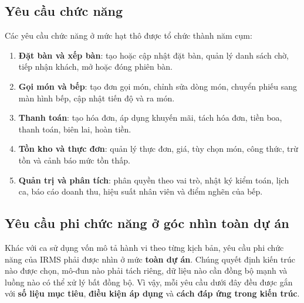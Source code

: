 \documentclass[11pt,a4paper]{article}
\begin{document}
\subsection{Yêu cầu chức năng}
Các yêu cầu chức năng ở mức hạt thô được tổ chức thành năm cụm:
\begin{enumerate}
  \item \textbf{Đặt bàn và xếp bàn}: tạo hoặc cập nhật đặt bàn, quản lý danh sách chờ, tiếp nhận khách, mở hoặc đóng phiên bàn.
  \item \textbf{Gọi món và bếp}: tạo đơn gọi món, chỉnh sửa dòng món, chuyển phiếu sang màn hình bếp, cập nhật tiến độ và ra món.
  \item \textbf{Thanh toán}: tạo hóa đơn, áp dụng khuyến mãi, tách hóa đơn, tiền boa, thanh toán, biên lai, hoàn tiền.
  \item \textbf{Tồn kho và thực đơn}: quản lý thực đơn, giá, tùy chọn món, công thức, trừ tồn và cảnh báo mức tồn thấp.
  \item \textbf{Quản trị và phân tích}: phân quyền theo vai trò, nhật ký kiểm toán, lịch ca, báo cáo doanh thu, hiệu suất nhân viên và điểm nghẽn của bếp.
\end{enumerate}

\subsection{Yêu cầu phi chức năng ở góc nhìn toàn dự án}
Khác với ca sử dụng vốn mô tả hành vi theo từng kịch bản, yêu cầu phi chức năng của IRMS phải được nhìn ở mức \textbf{toàn dự án}. Chúng quyết định kiến trúc nào được chọn, mô-đun nào phải tách riêng, dữ liệu nào cần đồng bộ mạnh và luồng nào có thể xử lý bất đồng bộ. Vì vậy, mỗi yêu cầu dưới đây đều được gắn với \textbf{số liệu mục tiêu}, \textbf{điều kiện áp dụng} và \textbf{cách đáp ứng trong kiến trúc}.
\end{document}
